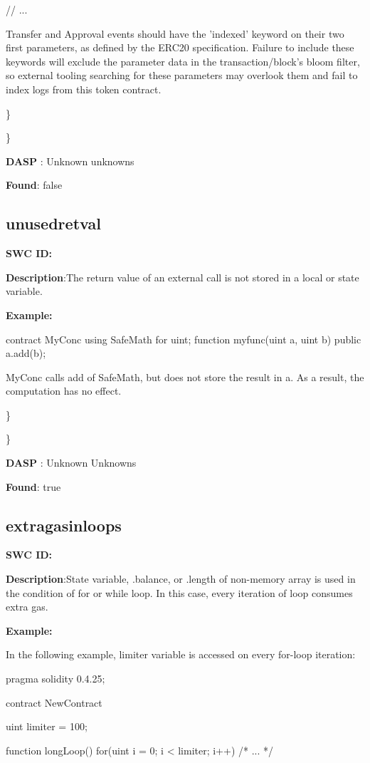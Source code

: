 \documentclass{article}
\begin{document}
{{    // ...
}

Transfer and Approval events should have the 'indexed' keyword on their two first parameters, as defined by the ERC20 specification. Failure to include these keywords will exclude the parameter data in the transaction/block's bloom filter, so external tooling searching for these parameters may overlook them and fail to index logs from this token contract.

\} 

\} 

\textbf{DASP} : Unknown unknowns

\textbf{Found}: false

\subsection{unused\textunderscore retval} 
\textbf{SWC \textunderscore ID:} 

\textbf{Description}:The return value of an external call is not stored in a local or state variable.


\textbf{Example:} 

contract MyConc{
    using SafeMath for uint;
    function my\textunderscore func(uint a, uint b) public{
        a.add(b);
    }
}

MyConc calls add of SafeMath, but does not store the result in a. As a result, the computation has no effect.

\} 

\} 

\textbf{DASP} : Unknown Unknowns

\textbf{Found}: true

\subsection{extra\textunderscore gas\textunderscore in\textunderscore loops} 
\textbf{SWC \textunderscore ID:} 

\textbf{Description}:State variable, .balance, or .length of non-memory array is used in the condition of for or while loop. In this case, every iteration of loop consumes extra gas.


\textbf{Example:} 

In the following example, limiter variable is accessed on every for-loop iteration:

pragma solidity 0.4.25;

contract NewContract {
    uint limiter = 100;

    function longLoop() {
        for(uint i = 0; i < limiter; i++) {
            /* ... */
        }
    }
}

}
\end{document}

